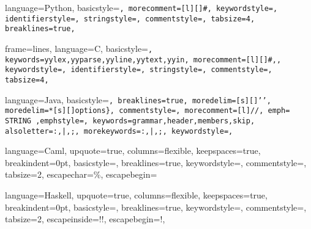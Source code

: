 {
	language=Python,
	basicstyle=\tt,
        morecomment=[l][\color{magenta}]{\#},
	keywordstyle=\color{chameleond},
	identifierstyle=\color{black},
        stringstyle=\color{skyblued},
        commentstyle=\color{red},
	tabsize=4,
        breaklines=true,
}


{
        frame=lines,
	language=C,
	basicstyle=\tt,
        keywords={yylex,yyparse,yyline,yytext,yyin},
        morecomment=[l][\color{magenta}]{\#,},
	keywordstyle=\color{chameleond},
	identifierstyle=\color{black},
        stringstyle=\color{skyblued},
        commentstyle=\color{red},
	tabsize=4,
}


{
  language=Java,
  basicstyle=\tt\scriptsize,
  breaklines=true,%
  moredelim=[s][\color{blue!50!black}\ttfamily]{'}{'},%
  moredelim=*[s][\color{black}\ttfamily]{options}{\}},%
  commentstyle={\color{gray}\itshape},%
  morecomment=[l]{//},%
  emph={%
    STRING%
  },emphstyle={\color{blue}\ttfamily},%
  keywords={grammar,header,members,skip},
  alsoletter={:,|,;},%
  morekeywords={:,|,;},%
  keywordstyle={\color{chameleond}},%
}


{       language=Caml,
        upquote=true,
        columns=flexible,
        keepspaces=true,
        breakindent=0pt,
        basicstyle=\ttfamily,
        breaklines=true,
        keywordstyle=\color{red},
        commentstyle=\color{darkgreen},
        tabsize=2,
        escapechar=\%,
        escapebegin=\color{blue}
        }

{       language=Haskell,
        upquote=true,
        columns=flexible,
        keepspaces=true,
        breakindent=0pt,
        basicstyle=\ttfamily\scriptsize,
        breaklines=true,
        keywordstyle=\color{red},
        commentstyle=\color{darkgreen},
        tabsize=2,
        escapeinside={!}{!},
        escapebegin=!\endgraf\color{gray},
        }



